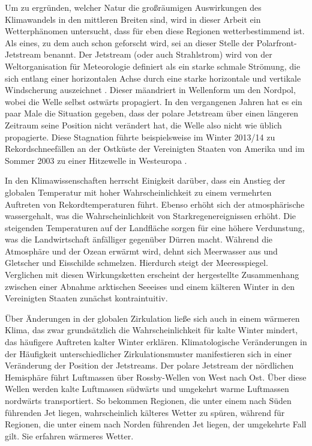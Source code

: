 Um zu ergründen, welcher Natur die großräumigen Auswirkungen des Klimawandels in den mittleren Breiten sind, wird in dieser Arbeit ein Wetterphänomen untersucht, dass für eben diese Regionen wetterbestimmend ist. Als eines, zu dem auch schon geforscht wird, sei an dieser Stelle der Polarfront-Jetstream benannt. Der Jetstream (oder auch Strahlstrom) wird von der Weltorganisation für Meteorologie definiert als ein starke schmale Strömung, die sich entlang einer horizontalen Achse durch eine starke horizontale und vertikale Windscherung auszeichnet \citep{wmo-1958}. Dieser mäandriert in Wellenform um den Nordpol, wobei die Welle selbst ostwärts propagiert. In den vergangenen Jahren hat es ein paar Male die Situation gegeben, dass der polare Jetstream über einen längeren Zeitraum seine Position nicht verändert hat, die Welle also nicht wie üblich propagierte. Diese Stagnation führte beispielsweise im Winter 2013/14 zu Rekordschneefällen an der Ostküste der Vereinigten Staaten von Amerika \citep{palmer-2014} und im Sommer 2003 zu einer Hitzewelle in Westeuropa \citep{petoukhov-2013}.

In den Klimawissenschaften herrscht Einigkeit darüber, dass ein Anstieg der globalen Temperatur mit hoher Wahrscheinlichkeit zu einem vermehrten Auftreten von Rekordtemperaturen führt. Ebenso erhöht sich der atmosphärische wassergehalt, was die Wahrscheinlichkeit von Starkregenereignissen erhöht. Die steigenden Temperaturen auf der Landfläche sorgen für eine höhere Verdunstung, was die Landwirtschaft änfälliger gegenüber Dürren macht. Während die Atmosphäre und der Ozean erwärmt wird, dehnt sich Meerwasser aus und Gletscher und Eisschilde schmelzen. Hierdurch steigt der Meeresspiegel. Verglichen mit diesen Wirkungsketten erscheint der hergestellte Zusammenhang zwischen einer Abnahme arktischen Seeeises und einem kälteren Winter in den Vereinigten Staaten zunächst kontraintuitiv. \citep{wallace-2014}

Über Änderungen in der globalen Zirkulation ließe sich auch in einem wärmeren Klima, das zwar grundsätzlich die Wahrscheinlichkeit für kalte Winter mindert, das häufigere Auftreten kalter Winter erklären. Klimatologische Veränderungen in der Häufigkeit unterschiedlicher Zirkulationsmuster manifestieren sich in einer Veränderung der Position der Jetstreams. Der polare Jetstream der nördlichen Hemisphäre führt Luftmassen über Rossby-Wellen von West nach Ost. Über diese Wellen werden kalte Luftmassen südwärts und umgekehrt warme Luftmassen nordwärts transportiert. So bekommen Regionen, die unter einem nach Süden führenden Jet liegen, wahrscheinlich kälteres Wetter zu spüren, während für Regionen, die unter einem nach Norden führenden Jet liegen, der umgekehrte Fall gilt. Sie erfahren wärmeres  Wetter. \citep{palmer-2014}

